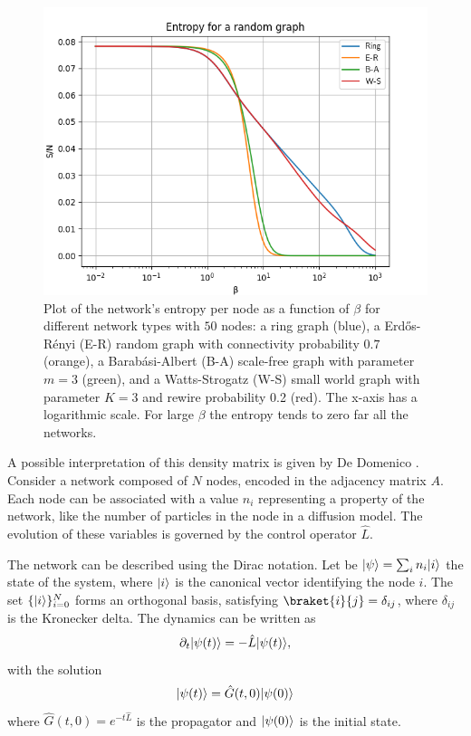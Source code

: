 \begin{figure}[ht!]
    \centering
    \includegraphics[width=0.75\linewidth]{image/random_graph.png}
    \caption{Plot of the network's entropy per node as a function of $\beta$ for different network types with $50$ nodes: a ring graph (blue), a Erd\H{o}s-Rényi (E-R) random graph with connectivity probability $0.7$ (orange), a Barab\'asi-Albert (B-A) scale-free graph with parameter $m=3$ (green), and a Watts-Strogatz (W-S) small world graph with parameter $K=3$ and rewire probability 0.2 (red). The x-axis has a logarithmic scale. For large $\beta$ the entropy tends to zero far all the networks.}
    \label{fig:ER-BA-WS}
\end{figure}



A possible interpretation of this density matrix is given by De Domenico \cite{De_Domenico_2020}.
Consider a network composed of $N$ nodes, encoded in the adjacency matrix $A$. Each node can be associated with a  value $n_i$ representing a property of the network, like the number of particles in the node in a diffusion model. 
The evolution of these variables is governed by the control operator $\hat L$. 

The network can be described using the Dirac notation. Let be $\lvert\psi\rangle = \sum_i n_i \lvert i\rangle$ the state of the system, where $\lvert i\rangle$ is the canonical vector identifying the node $i$. The set $\{\lvert i\rangle\}_{i=0}^N$ forms an orthogonal basis, satisfying $\braket{i}{j} = \delta_{ij}$, where $\delta_{ij}$ is the Kronecker delta.
The dynamics can be written as
\begin{equation} \label{time_evolution}
    \partial_t \lvert\psi(t)\rangle = - \hat L \lvert\psi(t)\rangle,
\end{equation}
with the solution
\begin{equation}
    \lvert\psi(t)\rangle = \hat G(t,0) \lvert\psi(0)\rangle
\end{equation}
where $\hat G(t,0) = e^{-t\hat L}$ is the propagator and $\lvert\psi(0)\rangle$ is the initial state. 

